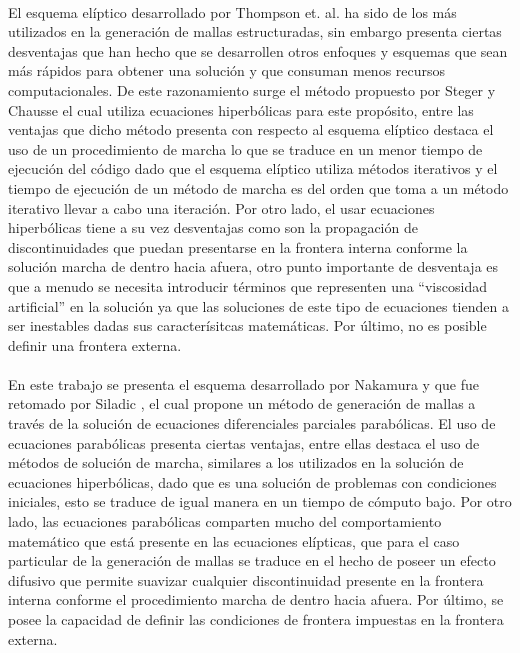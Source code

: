 \documentclass[letterpaper, openright, 12pt]{book}
\begin{document}
		\paragraph*{}
			El esquema elíptico desarrollado por Thompson et. al. \cite{thompson1974automatic} ha sido de los más utilizados en la generación de mallas estructuradas, sin embargo presenta ciertas desventajas que han hecho que se desarrollen otros enfoques y esquemas que sean más rápidos para obtener una solución y que consuman menos recursos computacionales. De este razonamiento surge el método propuesto por Steger y Chausse \cite{Hyperbolic-steger1980generation} el cual utiliza ecuaciones hiperbólicas para este propósito, entre las ventajas que dicho método presenta con respecto al esquema elíptico destaca el uso de un procedimiento de marcha lo que se traduce en un menor tiempo de ejecución del código dado que el esquema elíptico utiliza métodos iterativos y el tiempo de ejecución de un método de marcha es del orden que toma a un método iterativo llevar a cabo una iteración. Por otro lado, el usar ecuaciones hiperbólicas tiene a su vez desventajas como son la propagación de discontinuidades que puedan presentarse en la frontera interna conforme la solución marcha de dentro hacia afuera, otro punto importante de desventaja es que a menudo se necesita introducir términos que representen una ``viscosidad artificial'' en la solución ya que las soluciones de este tipo de ecuaciones tienden a ser inestables dadas sus caracterísitcas matemáticas. Por último, no es posible definir una frontera externa.
			
		\paragraph*{}
			En este trabajo se presenta el esquema desarrollado por Nakamura \cite{nakamuraParabolic} y que fue retomado por Siladic \cite{siladicParabolic}, el cual propone un método de generación de mallas a través de la solución de ecuaciones diferenciales parciales parabólicas. El uso de ecuaciones parabólicas presenta ciertas ventajas, entre ellas destaca el uso de métodos de solución de marcha, similares a los utilizados en la solución de ecuaciones hiperbólicas, dado que es una solución de problemas con condiciones iniciales, esto se traduce de igual manera en un tiempo de cómputo bajo. Por otro lado, las ecuaciones parabólicas comparten mucho del comportamiento matemático que está presente en las ecuaciones elípticas, que para el caso particular de la generación de mallas se traduce en el hecho de poseer un efecto difusivo que permite suavizar cualquier discontinuidad presente en la frontera interna conforme el procedimiento marcha de dentro hacia afuera. Por último, se posee la capacidad de definir las condiciones de frontera impuestas en la frontera externa.
		
\end{document}
